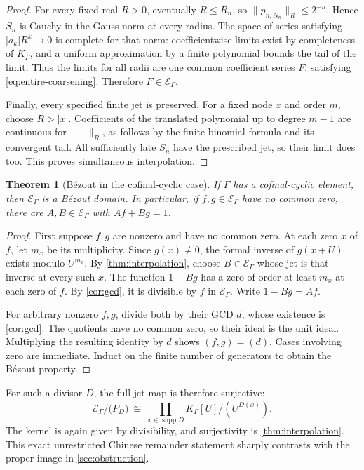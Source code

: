 \documentclass[11pt]{article}
\newtheorem{theorem}{Theorem}[section]
\theoremstyle{plain}
\theoremstyle{plain}
\theoremstyle{plain}
\theoremstyle{definition}
\theoremstyle{definition}
\theoremstyle{definition}
\theoremstyle{remark}
\newcommand{\K}{K_\Gamma}\newcommand{\E}{\mathcal E_\Gamma}
\DeclareMathOperator{\supp}{supp}\DeclareMathOperator{\lc}{lc}
\begin{document}
\begin{proof}
For every fixed real $R>0$, eventually $R\le R_n$, so
$\|p_{n,N_n}\|_R\le2^{-n}$. Hence $S_n$ is Cauchy in the Gauss norm
at every radius. The space of series satisfying
$|a_k|R^k\to0$ is complete for that norm: coefficientwise limits
exist by completeness of $\K$, and a uniform approximation by a
finite polynomial bounds the tail of the limit. Thus the limits for
all radii are one common coefficient series $F$, satisfying
\eqref{eq:entire-coarsening}. Therefore $F\in\E$.

Finally, every specified finite jet is preserved. For a fixed node
$x$ and order $m$, choose $R>|x|$. Coefficients of the translated
polynomial up to degree $m-1$ are continuous for $\|\cdot\|_R$,
as follows by the finite binomial formula and its convergent tail.
All sufficiently late $S_n$ have the prescribed jet, so their limit
does too. This proves simultaneous interpolation.
\end{proof}

\begin{theorem}[B\'ezout in the cofinal-cyclic case]\label{thm:bezout}
If $\Gamma$ has a cofinal-cyclic element, then $\E$ is a B\'ezout
domain. In particular, if $f,g\in\E$ have no common zero, there are
$A,B\in\E$ with $Af+Bg=1$.
\end{theorem}
\begin{proof}
First suppose $f,g$ are nonzero and have no common zero. At each zero
$x$ of $f$, let $m_x$ be its multiplicity. Since $g(x)\ne0$, the
formal inverse of $g(x+U)$ exists modulo $U^{m_x}$. By
\cref{thm:interpolation}, choose $B\in\E$ whose jet is that inverse
at every such $x$. The function $1-Bg$ has a zero of order at least
$m_x$ at each zero of $f$. By \cref{cor:gcd}, it is divisible by $f$
in $\E$. Write $1-Bg=Af$.

For arbitrary nonzero $f,g$, divide both by their GCD $d$, whose
existence is \cref{cor:gcd}. The quotients have no common zero, so
their ideal is the unit ideal. Multiplying the resulting identity
by $d$ shows $(f,g)=(d)$. Cases involving zero are immediate.
Induct on the finite number of generators to obtain the B\'ezout
property.
\end{proof}

For such a divisor $D$, the full jet map is therefore surjective:
\[
 \E\big/\bigl(P_D\bigr)
 \ \cong\ \prod_{x\in\supp D}\K[U]/(U^{D(x)}).
\]
The kernel is again given by divisibility, and surjectivity is
\cref{thm:interpolation}. This exact unrestricted Chinese remainder
statement sharply contrasts with the proper image in
\cref{sec:obstruction}.
\end{document}
